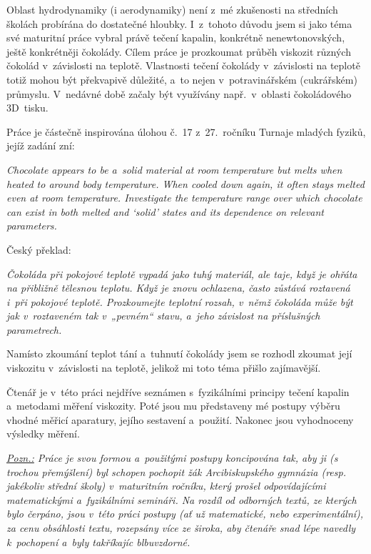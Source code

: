 \documentclass[12pt]{article}
\begin{document}
Oblast hydrodynamiky (i aerodynamiky) není z~mé zkušenosti na středních školách probírána do dostatečné hloubky. I~z~tohoto důvodu jsem si jako téma své maturitní práce vybral právě tečení kapalin, konkrétně nenewtonovských, ještě konkrétněji čokolády. Cílem práce je prozkoumat průběh viskozit různých čokolád v~závislosti na teplotě. Vlastnosti tečení čokolády v~závislosti na teplotě totiž mohou být překvapivě důležité, a~to nejen v~potravinářském (cukrářském) průmyslu. V~nedávné době začaly být využívány např.~v~oblasti čokoládového 3D~tisku.~\cite{Article:Flow_properties_molten_chocolate}
\par\noindent
Práce je částečně inspirována úlohou č.~17 z~27.~ročníku Turnaje mladých fyziků, jejíž zadání zní:
\begin{displayquote}
\emph{Chocolate appears to be a~solid material at room temperature but melts when heated to around body temperature. When cooled down again, it often stays melted even at room temperature. Investigate the temperature range over which chocolate can exist in both melted and ‘solid’ states and its dependence on relevant parameters.}~\cite{online:Turnaj}
\end{displayquote}
Český překlad:
\begin{displayquote}
\emph{Čokoláda při pokojové teplotě vypadá jako tuhý materiál, ale taje, když je ohřáta na přibližně tělesnou teplotu. Když je znovu ochlazena, často zůstává roztavená i~při pokojové teplotě. Prozkoumejte teplotní rozsah, v~němž čokoláda může být jak v~roztaveném tak v~„pevném“ stavu, a~jeho závislost na příslušných parametrech.}~\cite{online:Turnaj}
\end{displayquote}
Namísto zkoumání teplot tání a~tuhnutí čokolády jsem se rozhodl zkoumat její viskozitu v~závislosti na teplotě, jelikož mi toto téma přišlo zajímavější.
\par\noindent
Čtenář je v~této práci nejdříve seznámen s~fyzikálními principy tečení kapalin a~metodami měření viskozity. Poté jsou mu představeny mé postupy výběru vhodné měřicí aparatury, jejího sestavení a~použití. Nakonec jsou vyhodnoceny výsledky měření.
\label{sec:zadani_tmf}
\par\noindent
\emph{
\underline{Pozn.:} Práce je svou formou a~použitými postupy koncipována tak, aby ji (s trochou přemýšlení) byl schopen pochopit žák Arcibiskupského gymnázia (resp. jakékoliv střední školy) v~maturitním ročníku, který prošel odpovídajícími matematickými a~fyzikálními semináři. Na rozdíl od odborných textů, ze kterých bylo čerpáno, jsou v~této práci postupy (ať už matematické, nebo experimentální), za cenu obsáhlosti textu, rozepsány více ze široka, aby čtenáře snad lépe navedly k~pochopení a~byly takříkajíc \glqq blbuvzdorné\grqq.}
\end{document}
